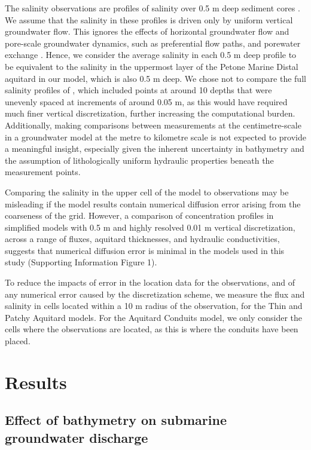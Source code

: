 \documentclass[draft, 10pt]{agujournal2019}
\begin{document}
The salinity observations are profiles of salinity over 0.5 m deep sediment cores \cite{hoffmann_fresh_2023}.
We assume that the salinity in these profiles is driven only by uniform vertical groundwater flow.
This ignores the effects of horizontal groundwater flow and pore-scale groundwater dynamics, such as preferential flow paths, and porewater exchange \cite{taniguchi_submarine_2019}.
Hence, we consider the average salinity in each 0.5 m deep profile to be equivalent to the salinity in the uppermost layer of the Petone Marine Distal aquitard in our model,
which is also 0.5 m deep. We chose not to compare the full salinity profiles of , which included points at around 10 depths that were unevenly spaced at increments of around 0.05 m,
as this would have required much finer vertical discretization, further increasing the computational burden.
Additionally, making comparisons between measurements at the centimetre-scale in a groundwater model at the metre to kilometre scale is not expected to provide a meaningful insight,
especially given the inherent uncertainty in bathymetry and the assumption of lithologically uniform hydraulic properties beneath the measurement points.

Comparing the salinity in the upper cell of the model to observations may be misleading if the model results contain numerical diffusion error arising from the coarseness of the grid.
However, a comparison of concentration profiles in simplified models with 0.5 m and highly resolved 0.01 m vertical discretization, across a range of fluxes, aquitard thicknesses, and hydraulic conductivities,
suggests that numerical diffusion error is minimal in the models used in this study (Supporting Information Figure 1).

To reduce the impacts of error in the location data for the observations, and of any numerical error caused by the discretization scheme,
we measure the flux and salinity in cells located within a 10 m radius of the observation, for the Thin and Patchy Aquitard models.
For the Aquitard Conduits model, we only consider the cells where the observations are located, as this is where the conduits have been placed.


\section{Results}

\subsection{Effect of bathymetry on submarine groundwater discharge}
\end{document}
